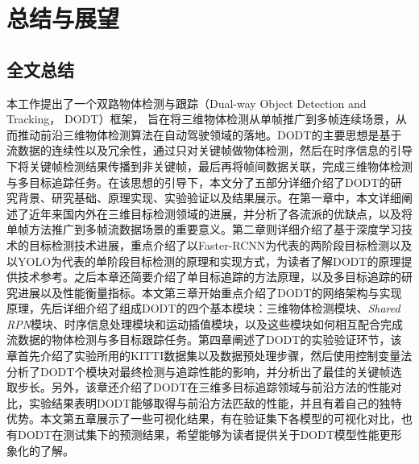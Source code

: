 \chapter{总结与展望}
\label{conclusion}

\section{全文总结}
\label{summary}
本工作提出了一个双路物体检测与跟踪（Dual-way Object Detection and Tracking， DODT）框架， 旨在将三维物体检测从单帧推广到多帧连续场景，从而推动前沿三维物体检测算法在自动驾驶领域的落地。DODT的主要思想是基于流数据的连续性以及冗余性，通过只对关键帧做物体检测，然后在时序信息的引导下将关键帧检测结果传播到非关键帧，最后再将帧间数据关联，完成三维物体检测与多目标追踪任务。在该思想的引导下，本文分了五部分详细介绍了DODT的研究背景、研究基础、原理实现、实验验证以及结果展示。在第一章中，本文详细阐述了近年来国内外在三维目标检测领域的进展，并分析了各流派的优缺点，以及将单帧方法推广到多帧流数据场景的重要意义。第二章则详细介绍了基于深度学习技术的目标检测技术进展，重点介绍了以Faster-RCNN为代表的两阶段目标检测以及以YOLO为代表的单阶段目标检测的原理和实现方式，为读者了解DODT的原理提供技术参考。之后本章还简要介绍了单目标追踪的方法原理，以及多目标追踪的研究进展以及性能衡量指标。本文第三章开始重点介绍了DODT的网络架构与实现原理，先后详细介绍了组成DODT的四个基本模块：三维物体检测模块、\textit{Shared RPN}模块、时序信息处理模块和运动插值模块，以及这些模块如何相互配合完成流数据的物体检测与多目标跟踪任务。第四章阐述了DODT的实验验证环节，该章首先介绍了实验所用的KITTI数据集以及数据预处理步骤，然后使用控制变量法分析了DODT个模块对最终检测与追踪性能的影响，并分析出了最佳的关键帧选取步长。另外，该章还介绍了DODT在三维多目标追踪领域与前沿方法的性能对比，实验结果表明DODT能够取得与前沿方法匹敌的性能，并且有着自己的独特优势。本文第五章展示了一些可视化结果，有在验证集下各模型的可视化对比，也有DODT在测试集下的预测结果，希望能够为读者提供关于DODT模型性能更形象化的了解。


